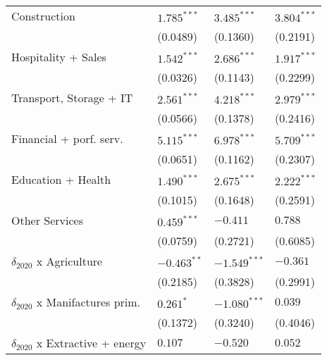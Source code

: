 \begin{tabular}{llll}
Construction                                       &      $1.785^{***}$ &      $3.485^{***}$ &      $3.804^{***}$ \\
                                                   &           (0.0489) &           (0.1360) &           (0.2191) \\
Hospitality + Sales                                &      $1.542^{***}$ &      $2.686^{***}$ &      $1.917^{***}$ \\
                                                   &           (0.0326) &           (0.1143) &           (0.2299) \\
Transport, Storage + IT                            &      $2.561^{***}$ &      $4.218^{***}$ &      $2.979^{***}$ \\
                                                   &           (0.0566) &           (0.1378) &           (0.2416) \\
Financial + porf. serv.                            &      $5.115^{***}$ &      $6.978^{***}$ &      $5.709^{***}$ \\
                                                   &           (0.0651) &           (0.1162) &           (0.2307) \\
Education + Health                                 &      $1.490^{***}$ &      $2.675^{***}$ &      $2.222^{***}$ \\
                                                   &           (0.1015) &           (0.1648) &           (0.2591) \\
Other Services                                     &      $0.459^{***}$ &           $-0.411$ &            $0.788$ \\
                                                   &           (0.0759) &           (0.2721) &           (0.6085) \\
$\delta_{2020}$ x Agriculture                      &      $-0.463^{**}$ &     $-1.549^{***}$ &           $-0.361$ \\
                                                   &           (0.2185) &           (0.3828) &           (0.2991) \\
$\delta_{2020}$ x Manifactures prim.               &          $0.261^*$ &     $-1.080^{***}$ &            $0.039$ \\
                                                   &           (0.1372) &           (0.3240) &           (0.4046) \\
$\delta_{2020}$ x Extractive + energy              &            $0.107$ &           $-0.520$ &            $0.052$ \\

\end{tabular}
